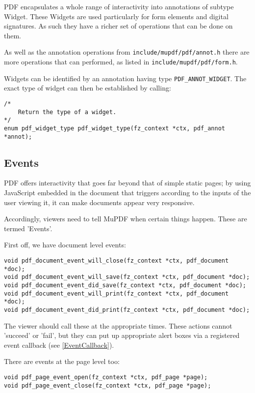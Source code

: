 \documentclass[oneside]{book}
\begin{document}
PDF encapsulates a whole range of interactivity into annotations of subtype Widget. These Widgets are used particularly for form elements and digital signatures. As such they have a richer set of operations that can be done on them.

As well as the annotation operations from \texttt{include/mupdf/pdf/annot.h} there are more operations that can performed, as listed in \texttt{include/mupdf/pdf/form.h}.

Widgets can be identified by an annotation having type \texttt{PDF\_ANNOT\_WIDGET}. The exact type of widget can then be established by calling:

\begin{lstlisting}
/*
	Return the type of a widget.
*/
enum pdf_widget_type pdf_widget_type(fz_context *ctx, pdf_annot *annot);
\end{lstlisting}

\subsection{Events}
\label{Events}

PDF offers interactivity that goes far beyond that of simple static pages; by using JavaScript embedded in the document that triggers according to the inputs of the user viewing it, it can make documents appear very responsive.

Accordingly, viewers need to tell MuPDF when certain things happen. These are termed 'Events'.

First off, we have document level events:

\begin{lstlisting}
void pdf_document_event_will_close(fz_context *ctx, pdf_document *doc);
void pdf_document_event_will_save(fz_context *ctx, pdf_document *doc);
void pdf_document_event_did_save(fz_context *ctx, pdf_document *doc);
void pdf_document_event_will_print(fz_context *ctx, pdf_document *doc);
void pdf_document_event_did_print(fz_context *ctx, pdf_document *doc);
\end{lstlisting}

The viewer should call these at the appropriate times. These actions cannot 'succeed' or 'fail', but they can put up appropriate alert boxes via a registered event callback (see \ref{EventCallback}).

There are events at the page level too:

\begin{lstlisting}
void pdf_page_event_open(fz_context *ctx, pdf_page *page);
void pdf_page_event_close(fz_context *ctx, pdf_page *page);
\end{lstlisting}
\end{document}
